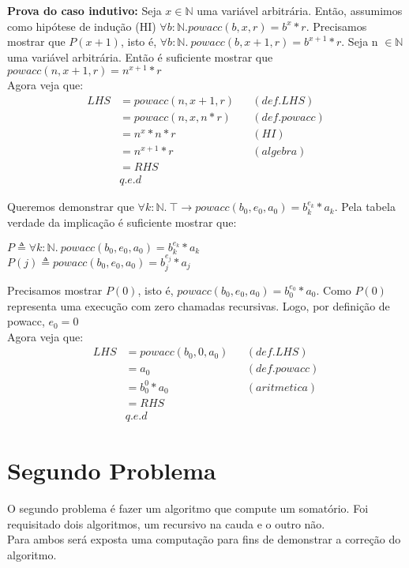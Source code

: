 \documentclass{article}
\begin{document}
\noindent\textbf{Prova do caso indutivo:}
Seja $x \in \mathbb{N}$ uma variável arbitrária. Então, assumimos como hipótese de indução (HI)
$\forall b:\mathbb{N}. powacc(b, x, r) = b^x * r$.
Precisamos mostrar que $P(x+1)$, isto é, $\forall b: \mathbb{N}.\: powacc(b, x+1, r) = b^{x+1} * r$.
Seja n $\in \mathbb{N}$ uma variável arbitrária. Então é suficiente mostrar que $powacc(n, x+1, r) = n^{x+1} * r$\\
Agora veja que:
\begin{align*}
LHS &= powacc(n, x+1, r) && (def. LHS)\\
&= powacc(n, x, n * r) && (def. powacc)\\
&= n^x * n * r && (HI)\\
&= n^{x+1} * r && (algebra)\\
&= RHS\\
& q.e.d
\end{align*}

\noindent Queremos demonstrar que
$\forall k:\mathbb{N}.\: \top \rightarrow powacc(b_0, e_0, a_0) = b_k^{e_k} * a_k$.
Pela tabela verdade da implicação é suficiente mostrar que:
\begin{center}
$P \triangleq \forall k:\mathbb{N}.\: powacc(b_0, e_0, a_0) = b_k^{e_k} * a_k$ \\
$P(j) \triangleq powacc(b_0, e_0, a_0) = b_j^{e_j} * a_j$ \\
\end{center}
Precisamos mostrar $P(0)$, isto é, $powacc(b_0, e_0, a_0) = b_0^{e_0} * a_0$.
Como $P(0)$ representa uma execução com zero chamadas recursivas. Logo, por definição de powacc, $e_0 = 0$ \\
Agora veja que:
\begin{align*}
LHS &= powacc(b_0, 0, a_0) && (def. LHS)\\
&= a_0 && (def. powacc)\\
&= b_0^0 * a_0 && (aritmetica)\\
&= RHS\\
& q.e.d
\end{align*}


\section{Segundo Problema}
O segundo problema é fazer um algoritmo que compute um somatório.
Foi requisitado dois algoritmos, um recursivo na cauda e o outro não. \\
Para ambos será exposta uma computação para fins de demonstrar a correção do algoritmo.
\end{document}
